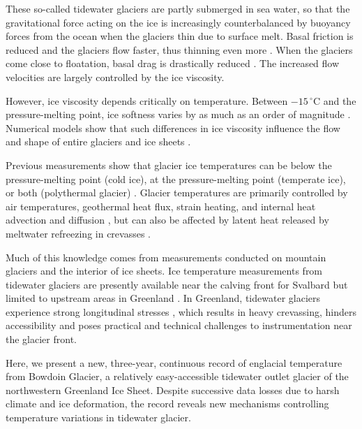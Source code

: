 \documentclass[utf8]{article}
\begin{document}
    These so-called tidewater glaciers are partly submerged in sea water, so
    that the gravitational force acting on the ice is increasingly
    counterbalanced by buoyancy forces from the ocean when the glaciers
    thin due to surface melt. Basal friction is
    reduced and the glaciers flow faster, thus thinning even more
    \citep{Meier.Post.1987}. When the glaciers come close to floatation, basal
    drag is drastically reduced \citep{Shapero.etal.2016, Seddik.etal.2019}.
    The increased flow velocities are largely controlled by the ice viscosity.

    However, ice viscosity depends critically on temperature. Between
    $-15\,^\circ$C and the pressure-melting point, ice softness varies by as
    much as an order of magnitude \citep[p.~72]{Cuffey.Paterson.2010}.
    Numerical models show that such differences
    in ice viscosity influence the flow and shape of entire
    glaciers and ice sheets \citep[e.g.,][Figs.~2 and~7]{Seguinot.etal.2016}.

    Previous measurements show that glacier ice temperatures can be below
    the pressure-melting point (cold ice), at the pressure-melting point
    (temperate ice), or both (polythermal glacier)
    \citep[p.~399]{Ahlmann.1935, Cuffey.Paterson.2010}. Glacier temperatures
    are primarily controlled by air temperatures, geothermal heat flux, strain
    heating, and internal heat advection and diffusion \citep{Q-Robin.1955},
    but can also be affected by latent heat released by meltwater refreezing in
    crevasses \citep{Phillips.etal.2010, Phillips.etal.2013, Luthi.etal.2015}.

    Much of this knowledge comes from measurements conducted on mountain
    glaciers and the interior of ice sheets. Ice temperature measurements from
    tidewater glaciers are presently available near the calving front for
    Svalbard \citep{Jania.etal.1996} but limited to upstream areas in Greenland
    \citep{Iken.etal.1993, Luthi.etal.2002, Luthi.etal.2015, Doyle.etal.2018}.
    In Greenland, tidewater glaciers experience strong longitudinal stresses
    \citep[e.g.,][]{Fastook.etal.1995}, which results in heavy crevassing,
    hinders accessibility and poses practical and technical challenges to
    instrumentation near the glacier front.

    Here, we present a new, three-year, continuous record of englacial
    temperature from Bowdoin Glacier, a relatively easy-accessible tidewater
    outlet
    glacier of the northwestern Greenland Ice Sheet. Despite successive data
    losses due to harsh climate and ice deformation, the record reveals
    new mechanisms controlling temperature variations in tidewater glacier.
\end{document}
